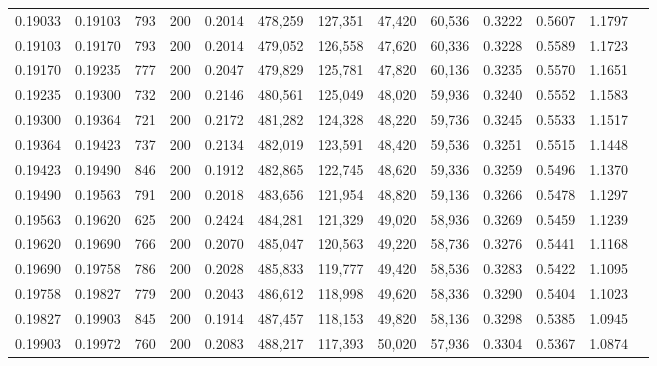 \begin{tabular}{rrrrrrrrrrrrr}
0.19033 & 0.19103 &    793 & 200 &                                     0.2014 & 478,259 & 127,351 &  47,420 &  60,536 & 0.3222 & 0.5607 & 1.1797 \\
0.19103 & 0.19170 &    793 & 200 &                                     0.2014 & 479,052 & 126,558 &  47,620 &  60,336 & 0.3228 & 0.5589 & 1.1723 \\
0.19170 & 0.19235 &    777 & 200 &                                     0.2047 & 479,829 & 125,781 &  47,820 &  60,136 & 0.3235 & 0.5570 & 1.1651 \\
0.19235 & 0.19300 &    732 & 200 &                                     0.2146 & 480,561 & 125,049 &  48,020 &  59,936 & 0.3240 & 0.5552 & 1.1583 \\
0.19300 & 0.19364 &    721 & 200 &                                     0.2172 & 481,282 & 124,328 &  48,220 &  59,736 & 0.3245 & 0.5533 & 1.1517 \\
0.19364 & 0.19423 &    737 & 200 &                                     0.2134 & 482,019 & 123,591 &  48,420 &  59,536 & 0.3251 & 0.5515 & 1.1448 \\
0.19423 & 0.19490 &    846 & 200 &                                     0.1912 & 482,865 & 122,745 &  48,620 &  59,336 & 0.3259 & 0.5496 & 1.1370 \\
0.19490 & 0.19563 &    791 & 200 &                                     0.2018 & 483,656 & 121,954 &  48,820 &  59,136 & 0.3266 & 0.5478 & 1.1297 \\
0.19563 & 0.19620 &    625 & 200 &                                     0.2424 & 484,281 & 121,329 &  49,020 &  58,936 & 0.3269 & 0.5459 & 1.1239 \\
0.19620 & 0.19690 &    766 & 200 &                                     0.2070 & 485,047 & 120,563 &  49,220 &  58,736 & 0.3276 & 0.5441 & 1.1168 \\
0.19690 & 0.19758 &    786 & 200 &                                     0.2028 & 485,833 & 119,777 &  49,420 &  58,536 & 0.3283 & 0.5422 & 1.1095 \\
0.19758 & 0.19827 &    779 & 200 &                                     0.2043 & 486,612 & 118,998 &  49,620 &  58,336 & 0.3290 & 0.5404 & 1.1023 \\
0.19827 & 0.19903 &    845 & 200 &                                     0.1914 & 487,457 & 118,153 &  49,820 &  58,136 & 0.3298 & 0.5385 & 1.0945 \\
0.19903 & 0.19972 &    760 & 200 &                                     0.2083 & 488,217 & 117,393 &  50,020 &  57,936 & 0.3304 & 0.5367 & 1.0874 \\

\end{tabular}
